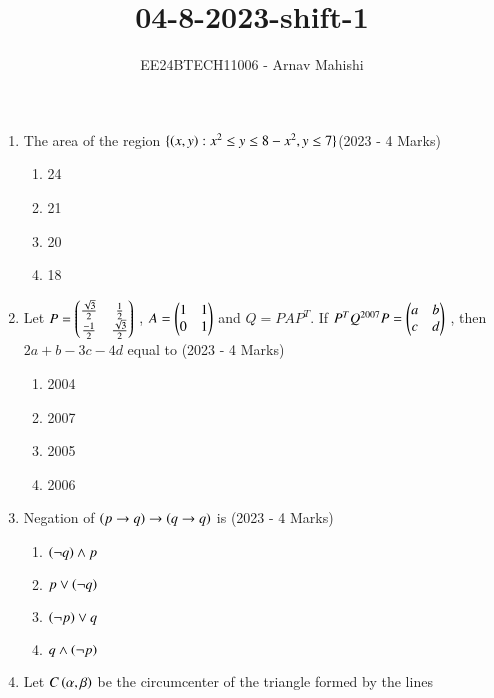 \documentclass[journal]{IEEEtran}
\begin{document}

\vspace{3cm}

\title{04-8-2023-shift-1}
\author{EE24BTECH11006 - Arnav Mahishi}
{\let\newpage\relax\maketitle}
\begin{enumerate}
\item{
The area of the region $\{\left(x,y\right):x^2\leq y \leq 8-x^2,y \leq 7\}$\hfill{(2023 - 4 Marks)}
\begin{multicols}{4}
\begin{enumerate}
\item24
\item21
\item20
\item18
\end{enumerate}
\end{multicols}
}
\item{
Let $P=\begin{pmatrix}\frac{\sqrt{3}}{2}&\frac{1}{2}\\\frac{-1}{2}&\frac{\sqrt{3}}{2}\end{pmatrix}$ , $A=\begin{pmatrix}1&1\\0&1\end{pmatrix}$ and $Q=PAP^T$. If $P^TQ^{2007}P=\begin{pmatrix}a&b\\c&d\end{pmatrix}$ , then $2a+b-3c-4d$ equal to
\hfill{(2023 - 4 Marks)}
\begin{multicols}{4}
\begin{enumerate}
\item 2004
\item 2007
\item 2005
\item 2006
\end{enumerate}
\end{multicols}}
\item{
Negation of $\left(p\rightarrow q\right)\rightarrow\left(q\rightarrow q\right)$ is 
\hfill
{(2023 - 4 Marks)}
\begin{multicols}{4}
\begin{enumerate}
\item $\left(\neg q\right)\wedge p$
\item $p\vee\left(\neg q\right)$
\item $\left(\neg p\right)\vee q$
\item $q\wedge\left(\neg p\right)$
\end{enumerate}
\end{multicols}
}
\item{
Let $C\left(\alpha,\beta\right)$ be the circumcenter of the triangle formed by the lines\\
}
\end{enumerate}
\end{document}
